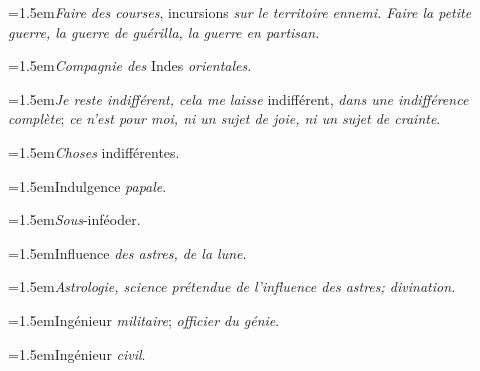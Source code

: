 \par{\dictfontsize\hangindent=1.5em\noindent \textit{Faire des courses}, incursions \textit{sur le territoire ennemi. Faire la petite guerre, la guerre de guérilla, la guerre en partisan.} \par}
\par{\dictfontsize\hangindent=1.5em\noindent \textit{Compagnie des} Indes \textit{orientales}. \par}
\par{\dictfontsize\hangindent=1.5em\noindent \textit{Je reste indifférent, cela me laisse} indifférent, \textit{dans une indifférence complète}; \textit{ce n’est pour moi, ni un sujet de joie, ni un sujet de crainte}. \par}
\par{\dictfontsize\hangindent=1.5em\noindent \textit{Choses} indifférentes. \par}
\par{\dictfontsize\hangindent=1.5em\noindent Indulgence \textit{papale}. \par}
\par{\dictfontsize\hangindent=1.5em\noindent \textit{Sous}-inféoder. \par}
\par{\dictfontsize\hangindent=1.5em\noindent Influence \textit{des astres, de la lune}. \par}
\par{\dictfontsize\hangindent=1.5em\noindent \textit{Astrologie, science prétendue de l’influence des astres; divination.} \par}
\par{\dictfontsize\hangindent=1.5em\noindent Ingénieur \textit{militaire}; \textit{officier du génie}. \par}
\par{\dictfontsize\hangindent=1.5em\noindent Ingénieur \textit{civil}. \par}
